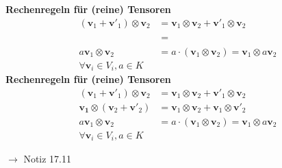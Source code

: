 \documentclass[11pt]{article}
\renewcommand{\cite}[1]{\par\bigskip\hfill{\color{gray}\tiny\(\to\) #1}}
\renewcommand{\vec}[1]{\mathbf{#1}}
\newenvironment{field}{}{\newpage}
\newif\ifnote
\newenvironment{note}{\notetrue}{\notefalse}
\begin{document}
\begin{note}
    \begin{field}
        \textbf{Rechenregeln für (reine) Tensoren}
        \begin{align*}
            (\vec{v}_1 + \vec{v}'_1) \otimes \vec{v}_2 &= \vec{v}_1 \otimes \vec{v}_2 + \vec{v}'_1 \otimes \vec{v}_2\\
            \phantom{\vec{v_1} \otimes (\vec{v}_2 + \vec{v}'_2)} &= \phantom{\vec{v}_1 \otimes \vec{v}_2 + \vec{v}_1 \otimes \vec{v}'_2}\\
            a\vec{v}_1 \otimes \vec{v}_2 &= a \cdot (\vec{v}_1\otimes \vec{v}_2) = \vec{v}_1 \otimes a\vec{v}_2\\
            \forall \vec{v}_i\in V_i, a\in K
        \end{align*}
    \end{field}
    \begin{field}
        \textbf{Rechenregeln für (reine) Tensoren}
        \begin{align*}
            (\vec{v}_1 + \vec{v}'_1) \otimes \vec{v}_2 &= \vec{v}_1 \otimes \vec{v}_2 + \vec{v}'_1 \otimes \vec{v}_2\\
            \vec{v_1} \otimes (\vec{v}_2 + \vec{v}'_2) &= \vec{v}_1 \otimes \vec{v}_2 + \vec{v}_1 \otimes \vec{v}'_2\\
            a\vec{v}_1 \otimes \vec{v}_2 &= a \cdot (\vec{v}_1\otimes \vec{v}_2) = \vec{v}_1 \otimes a\vec{v}_2\\
            \forall \vec{v}_i\in V_i, a\in K
        \end{align*}
        \cite{Notiz 17.11}
    \end{field}


\end{note}
\end{document}
